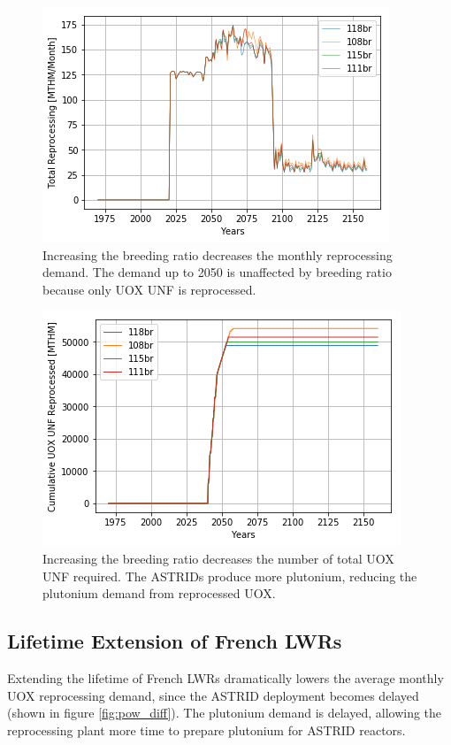 \begin{figure}[htbp!]
    \begin{center}
        \includegraphics[scale=0.6]{./images/sensitivity/br_tot_rep.png}
    \end{center}
    \caption{Increasing the breeding ratio decreases the monthly reprocessing demand. The
             demand up to 2050 is unaffected by breeding ratio because only \gls{UOX} \gls{UNF}
             is reprocessed.}
    \label{fig:br_rep}
\end{figure}


\begin{figure}[htbp!]
    \begin{center}
        \includegraphics[scale=0.6]{./images/sensitivity/br_uox_unf_cum.png}
    \end{center}
    \caption{Increasing the breeding ratio decreases the number of total \gls{UOX} \gls{UNF}
             required. The \glspl{ASTRID} produce more plutonium, reducing the plutonium demand
             from reprocessed \gls{UOX}.}
    \label{fig:br_uox}
\end{figure}


\subsection{Lifetime Extension of French \glspl{LWR}}\label{sec:life}
Extending the lifetime of French \glspl{LWR} dramatically lowers the average
monthly \gls{UOX} reprocessing demand, since the \gls{ASTRID} deployment becomes 
delayed (shown in figure \ref{fig:pow_diff}). The plutonium demand is delayed,
 allowing the reprocessing plant more time to prepare plutonium for \gls{ASTRID} reactors. 

